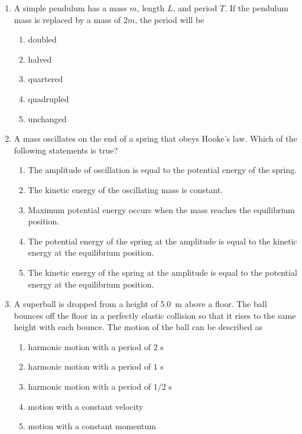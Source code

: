\documentclass{../../oss-apphys}
\begin{document}
\genheader


\genmultidirections

\gengravity

\raggedcolumns
\begin{multicols}{2}

  \begin{enumerate}[leftmargin=18pt]

  \item A simple pendulum has a mass $m$, length $L$, and period $T$. If the
    pendulum mass is replaced by a mass of $2m$, the period will be
    \begin{enumerate}[noitemsep,topsep=0pt,leftmargin=18pt,label=(\Alph*)]
    \item doubled
    \item halved
    \item quartered
    \item quadrupled
    \item unchanged
    \end{enumerate}

  \item A mass oscillates on the end of a spring that obeys Hooke's law. Which
    of the following statements is true?
    \begin{enumerate}[noitemsep,topsep=0pt,leftmargin=18pt,label=(\Alph*)]
    \item The amplitude of oscillation is equal to the potential energy of the
      spring.
    \item The kinetic energy of the oscillating mass is constant.
    \item Maximum potential energy occurs when the mass reaches the
      equilibrium position.
    \item The potential energy of the spring at the amplitude is equal to the
      kinetic energy at the equilibrium position.
    \item The kinetic energy of the spring at the amplitude is equal to the
      potential energy at the equilibrium position.
    \end{enumerate}

  \item A superball is dropped from a height of \SI{5.0}{\metre} above a floor.
    The ball bounces off the floor in a perfectly elastic collision so that it
    rises to the same height with each bounce. The motion of the ball can be
    described as
    \begin{enumerate}[noitemsep,topsep=0pt,leftmargin=18pt,label=(\Alph*)]
    \item harmonic motion with a period of $2$ \si{\second}
    \item harmonic motion with a period of $1$ \si{\second}
    \item harmonic motion with a period of $1/2$ \si{\second}
    \item motion with a constant velocity
    \item motion with a constant momentum
    \end{enumerate}


\end{enumerate}
\end{multicols}
\end{document}
